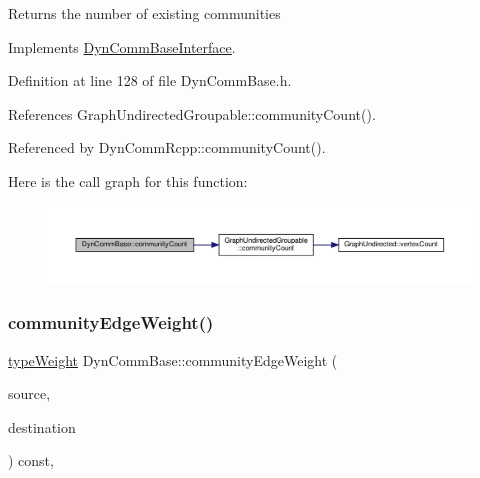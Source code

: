 \begin{DoxyReturn}{Returns}
the number of existing communities 
\end{DoxyReturn}


Implements \hyperlink{classDynCommBaseInterface_aa61588ce385fd66855e17747cf188a85}{Dyn\+Comm\+Base\+Interface}.



Definition at line 128 of file Dyn\+Comm\+Base.\+h.



References Graph\+Undirected\+Groupable\+::community\+Count().



Referenced by Dyn\+Comm\+Rcpp\+::community\+Count().

Here is the call graph for this function\+:
\nopagebreak
\begin{figure}[H]
\begin{center}
\leavevmode
\includegraphics[width=350pt]{classDynCommBase_add5d1d59a3f20b4ba039342b31551fb3_cgraph}
\end{center}
\end{figure}
\mbox{\label{classDynCommBase_a1ef408ec71d82b008fc0229416c77b61}} 
\subsubsection{\texorpdfstring{community\+Edge\+Weight()}{communityEdgeWeight()}}
{\footnotesize\ttfamily \hyperlink{edge_8h_a2e7ea3be891ac8b52f749ec73fee6dd2}{type\+Weight} Dyn\+Comm\+Base\+::community\+Edge\+Weight (\begin{DoxyParamCaption}\item[{\hyperlink{graphUndirectedGroupable_8h_a914da95c9ea7f14f4b7f875c36818556}{type\+Community}}]{source,  }\item[{\hyperlink{graphUndirectedGroupable_8h_a914da95c9ea7f14f4b7f875c36818556}{type\+Community}}]{destination }\end{DoxyParamCaption}) const\hspace{0.3cm}{\ttfamily [inline]}, {\ttfamily [virtual]}}


